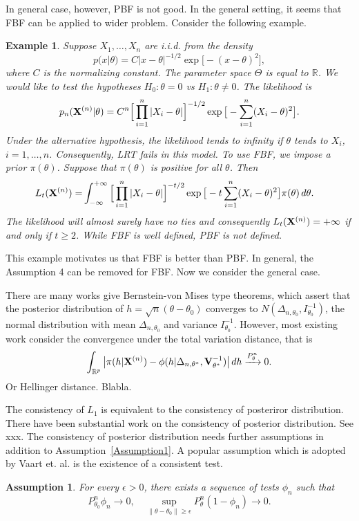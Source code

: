 \documentclass[3p]{elsarticle}
\theoremstyle{plain}
\newtheorem{example}{Example}
\newtheorem{assumption}{\quad\quad Assumption}
\theoremstyle{definition}
\theoremstyle{remark}
\begin{document}
 In general case, however, PBF is not good.
In the general setting, it seems that FBF can be applied to wider problem.
Consider the following example.

\begin{example}
Suppose $X_1,\ldots,X_n$ are i.i.d. from the density
$$
    p(x|\theta)=C |x-\theta|^{-1/2}\exp\big[-(x-\theta)^2\big]
,
$$
    where $C$ is the normalizing constant. The parameter space $\Theta$ is equal to $\mathbb{R}$.
    We would like to test the hypotheses $H_0:\theta=0$ vs $H_1:\theta\neq 0$.
    The likelihood is
    $$
    p_n(\mathbf{X}^{(n)}|\theta)=C^n \Big[\prod_{i=1}^n |X_i-\theta|\Big]^{-1/2}
    \exp \big[-\sum_{i=1}^n (X_i-\theta)^2 \big].
    $$
    Under the alternative hypothesis, the likelihood tends to infinity if $\theta$ tends to $X_i$, $i=1,\ldots, n$.
    Consequently, LRT fails in this model.
    To use FBF, we impose a prior $\pi(\theta)$.
    Suppose that $\pi(\theta)$ is positive for all $\theta$.
Then
$$
    \begin{aligned}
        L_t(\mathbf{X}^{(n)})=&
    \int_{-\infty}^{+\infty}
\Big[\prod_{i=1}^n |X_i-\theta|\Big]^{-t/2}
    \exp \big[-t\sum_{i=1}^n (X_i-\theta)^2 \big]
        \pi(\theta)
    \,
    d \theta.
    \end{aligned}
$$
    The likelihood will almost surely have no ties and consequently $L_t(\mathbf{X}^{(n)})=+\infty$ if and only if $t\geq 2$.
    While FBF is well defined, PBF is not defined.
\end{example}

This example motivates us that FBF is better than PBF.
In general, the Assumption 4 can be removed for FBF.
Now we consider the general case.

There are many works give Bernstein-von Mises type theorems, which assert that the posterior distribution of $h=\sqrt{n}(\theta-\theta_0)$ converges to $N(\Delta_{n,\theta_0},I_{\theta_0}^{-1})$, the normal distribution with mean $\Delta_{n,\theta_0}$ and variance $I_{\theta_0}^{-1}$.
However, most existing work consider the convergence under the total variation distance, that is
$$
\int_{\mathbb{R}^p}\big|\pi(h|\mathbf{X}^{(n)})-\phi(h|\Delta_{n,\theta^*},\mathbf{V}_{\theta^*}^{-1})\big| \, dh \xrightarrow{P_{\theta}^n} 0.
$$
Or Hellinger distance. Blabla.

The consistency of $L_1$ is equivalent to the consistency of posteriror distribution. 
There have been substantial work on the consistency of posterior distribution.
See xxx.
The consistency of posterior distribution needs further assumptions in addition to Assumption~\ref{Assumption1}.
A popular assumption which is adopted by Vaart et. al. is the existence of a consistent test.
\begin{assumption}\label{Assumption2}
    For every $\epsilon>0$, there exists a sequence of tests $\phi_n$ such that
        \begin{equation}
            P_{\theta_0}^n\phi_n\to 0,\quad \sup_{\|\theta-\theta_0\|\geq \epsilon} P_\theta^n(1-\phi_n)\to 0.
        \end{equation}
\end{assumption}
\end{document}
